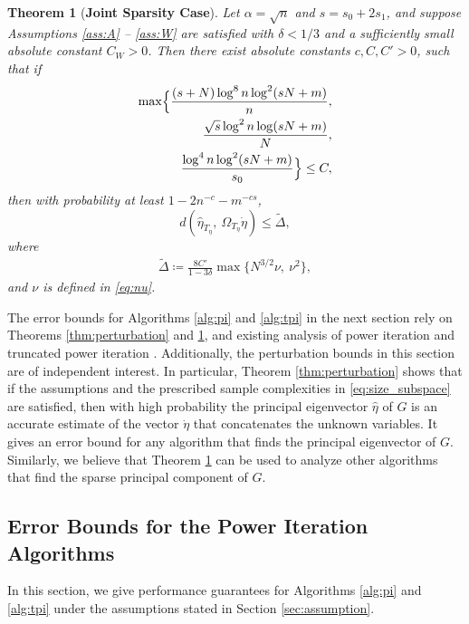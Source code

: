 \documentclass[11pt,journal]{IEEEtran}
\newtheorem{theorem}{Theorem}[section]
\begin{document}
\begin{theorem}[\textbf{Joint Sparsity Case}] \label{thm:perturbation2_alt}
Let $\alpha =\sqrt{n}$ and $s=s_0+2s_1$, and suppose Assumptions \ref{ass:A} -- \ref{ass:W} are satisfied with $\delta < 1/3$ and a sufficiently small absolute constant $C_W > 0$. Then there exist absolute constants $c,C,C' > 0$, such that if
\begin{align}
 \max\Bigl\{\frac{(s+N)\log^8 n \log^2(sN+m)}{n}, \nonumber\\
 \frac{\sqrt{s}\log^2 n \log(sN+m)}{N},  \nonumber\\
 \frac{\log^4 n \log^2(sN+m)}{s_0} \Bigr\} \leq C, \label{eq:size_sparsity_alt}
\end{align}
then with probability at least $1-2n^{-c} - m^{-cs}$,
\[
d(\hat{\eta}_{T_\eta},~\Omega_{T_\eta} \dot{\eta}) \leq \widetilde{\Delta},
\]
where
\begin{align}
\widetilde{\Delta} \coloneqq
\frac{8C'}{1-3\delta} \max \{N^{3/2} \nu,~\nu^2 \},  \label{eq:Delta_alt}
\end{align}
and $\nu$ is defined in \eqref{eq:nu}.
\end{theorem}



The error bounds for Algorithms \ref{alg:pi} and \ref{alg:tpi} in the next section rely on Theorems \ref{thm:perturbation} and \ref{thm:perturbation2_alt}, and existing analysis of power iteration \cite{Golub1996} and truncated power iteration \cite{Yuan2013}. Additionally, the perturbation bounds in this section are of independent interest. In particular, 
Theorem \ref{thm:perturbation} shows that if the assumptions and the prescribed sample complexities in \eqref{eq:size_subspace} are satisfied, then with high probability the principal eigenvector $\hat{\eta}$ of $G$ is an accurate estimate of the vector $\dot{\eta}$ that concatenates the unknown variables. It gives an error bound for any algorithm that finds the principal eigenvector of $G$.
Similarly, we believe that Theorem \ref{thm:perturbation2_alt} can be used to analyze other algorithms that find the sparse principal component of $G$. 



\subsection{Error Bounds for the Power Iteration Algorithms}
In this section, we give performance guarantees for Algorithms \ref{alg:pi} and \ref{alg:tpi} under the assumptions stated in Section \ref{sec:assumption}. 
\end{document}
